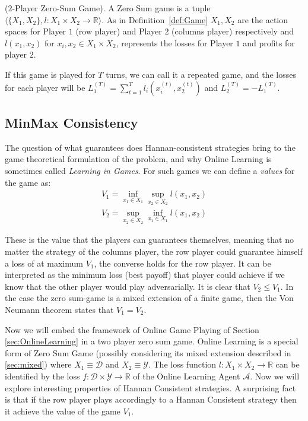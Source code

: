 \begin{definition}($2$-Player Zero-Sum Game).\label{def:ZSG}
A Zero Sum game is a tuple $\langle\{X_1,X_2\},l:X_1\times X_2\to\mathbb R\rangle$. As in Definition~\ref{def:Game} $X_1,X_2$ are the action spaces for Player $1$ (row player) and Player 2 (columns player) respectively and $l(x_1,x_2)$ for $x_i,x_2\in X_1\times X_2$, represents the losses for Player $1$ and profits for player $2$.
\end{definition}

If this game is played for $T$ turns, we can call it a repeated game, and the losses for each player will be $L_1^{(T)}=\sum\limits_{t=1}^Tl_i\left(x_i^{(t)},x_2^{(t)}\right)$ and $L_2^{(T)}=-L_1^{(T)}$. 


\subsection{MinMax Consistency}
The question of what guarantees does Hannan-consistent strategies bring to the game theoretical formulation of the problem, and why Online Learning is sometimes called \emph{Learning in Games}.
For such games we can define a \emph{values} for the game as: 
\begin{align}
    V_1=\inf\limits_{x_1\in X_1}\sup\limits_{x_2\in X_2}l(x_1,x_2)\\
	V_2=\sup\limits_{x_2\in X_2}\inf\limits_{x_1\in X_1}l(x_1,x_2)
\end{align}

These is the value that the players can guarantees themselves, meaning that no matter the strategy of the columns player, the row player could guarantee himself a loss of at maximum $V_1$, the converse holds for the row player. It can be interpreted as the minimum loss (best payoff) that player could achieve if we know that the other player would play adversarially. It is clear that $V_2\le V_1$. In the case the zero sum-game is a mixed extension of a finite game, then the Von Neumann theorem states that $V_1=V_2$.
 
Now we will embed the framework of Online Game Playing of Section \ref{sec:OnlineLearning} in a two player zero sum game. 
Online Learning is a special form of Zero Sum Game (possibly considering its mixed extension described in \ref{sec:mixed}) where $X_1\equiv \mathcal D$ and $X_2\equiv \mathcal Y$. The loss function $l:X_1\times X_2\to\mathbb R$ can be identified by the loss $f:\mathcal D\times \mathcal Y\to\mathbb R$ of the Online Learning Agent $\mathcal A$.
Now we will explore interesting properties of Hannan Consistent strategies. A surprising fact is that if the row player plays accordingly to a Hannan Consistent strategy then it achieve the value of the game $V_1$. 


